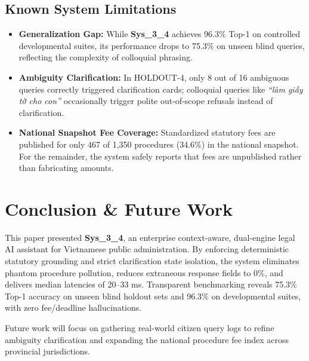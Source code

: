\documentclass[11pt,a4paper]{article}
\begin{document}
\subsection{Known System Limitations}
\begin{itemize}
    \item \textbf{Generalization Gap:} While \textbf{Sys\_3\_4} achieves 96.3\% Top-1 on controlled developmental suites, its performance drops to 75.3\% on unseen blind queries, reflecting the complexity of colloquial phrasing.
    \item \textbf{Ambiguity Clarification:} In HOLDOUT-4, only 8 out of 16 ambiguous queries correctly triggered clarification cards; colloquial queries like \textit{``làm giấy tờ cho con''} occasionally trigger polite out-of-scope refusals instead of clarification.
    \item \textbf{National Snapshot Fee Coverage:} Standardized statutory fees are published for only 467 of 1,350 procedures (34.6\%) in the national snapshot. For the remainder, the system safely reports that fees are unpublished rather than fabricating amounts.
\end{itemize}

\section{Conclusion \& Future Work}
This paper presented \textbf{Sys\_3\_4}, an enterprise context-aware, dual-engine legal AI assistant for Vietnamese public administration. By enforcing deterministic statutory grounding and strict clarification state isolation, the system eliminates phantom procedure pollution, reduces extraneous response fields to 0\%, and delivers median latencies of 20--33 ms. Transparent benchmarking reveals 75.3\% Top-1 accuracy on unseen blind holdout sets and 96.3\% on developmental suites, with zero fee/deadline hallucinations.

Future work will focus on gathering real-world citizen query logs to refine ambiguity clarification and expanding the national procedure fee index across provincial jurisdictions.
\end{document}
